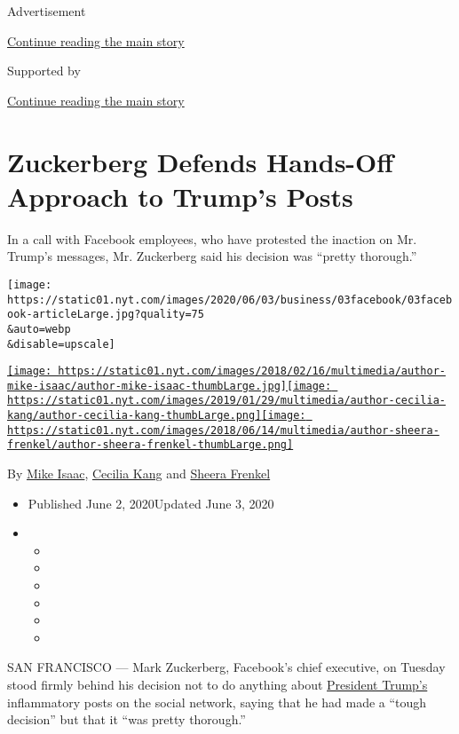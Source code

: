 Advertisement

\protect\hyperlink{after-top}{Continue reading the main story}

Supported by

\protect\hyperlink{after-sponsor}{Continue reading the main story}

\hypertarget{zuckerberg-defends-hands-off-approach-to-trumps-posts}{%
\section{Zuckerberg Defends Hands-Off Approach to Trump's
Posts}\label{zuckerberg-defends-hands-off-approach-to-trumps-posts}}

In a call with Facebook employees, who have protested the inaction on
Mr. Trump's messages, Mr. Zuckerberg said his decision was ``pretty
thorough.''

\texttt{[image: https://static01.nyt.com/images/2020/06/03/business/03facebook/03facebook-articleLarge.jpg?quality=75\\\&auto=webp\\\&disable=upscale]}

\href{https://www.nytimes.com/by/mike-isaac}{\texttt{[image: https://static01.nyt.com/images/2018/02/16/multimedia/author-mike-isaac/author-mike-isaac-thumbLarge.jpg]}}\href{https://www.nytimes.com/by/cecilia-kang}{\texttt{[image: https://static01.nyt.com/images/2019/01/29/multimedia/author-cecilia-kang/author-cecilia-kang-thumbLarge.png]}}\href{https://www.nytimes.com/by/sheera-frenkel}{\texttt{[image: https://static01.nyt.com/images/2018/06/14/multimedia/author-sheera-frenkel/author-sheera-frenkel-thumbLarge.png]}}

By \href{https://www.nytimes.com/by/mike-isaac}{Mike Isaac},
\href{https://www.nytimes.com/by/cecilia-kang}{Cecilia Kang} and
\href{https://www.nytimes.com/by/sheera-frenkel}{Sheera Frenkel}

\begin{itemize}
\item
  Published June 2, 2020Updated June 3, 2020
\item
  \begin{itemize}
  \item
  \item
  \item
  \item
  \item
  \item
  \end{itemize}
\end{itemize}

SAN FRANCISCO --- Mark Zuckerberg, Facebook's chief executive, on
Tuesday stood firmly behind his decision not to do anything about
\href{https://www.nytimes.com/2020/06/02/us/politics/trump-bible-photo-op.html}{President
Trump's} inflammatory posts on the social network, saying that he had
made a ``tough decision'' but that it ``was pretty thorough.''

